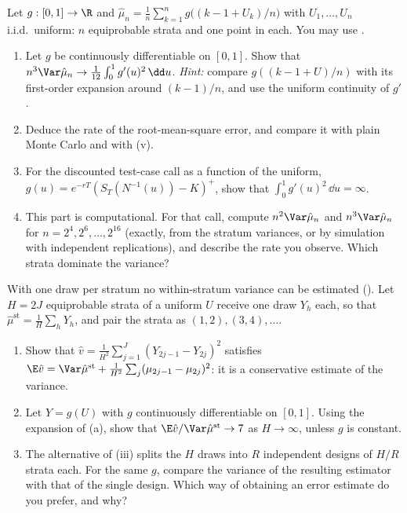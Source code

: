 \begin{exercise}\label{ex:st-one-point}
\medium Let $g:[0,1]\to\R$ and $\hat\mu_n=\frac1n\sum_{k=1}^ng\big((k-1+U_k)/n\big)$ with
$U_1,\dots,U_n$ i.i.d.\ uniform: $n$ equiprobable strata and one point in each. You may use
.
\begin{enumerate}[label=(\alph*)]
  \item Let $g$ be continuously differentiable on $[0,1]$. Show that
    $n^3\Var\hat\mu_n\to\frac1{12}\int_0^1g'(u)^2\,\dd u$. \emph{Hint:} compare
    $g((k-1+U)/n)$ with its first-order expansion around $(k-1)/n$, and use the uniform
    continuity of $g'$.
  \item Deduce the rate of the root-mean-square error, and compare it with plain Monte Carlo and
    with (v).
  \item For the discounted test-case call as a function of the uniform,
    $g(u)=e^{-rT}(S_T(N^{-1}(u))-K)^+$, show that $\int_0^1g'(u)^2\,\dd u=\infty$.
  \item This part is computational. For that call, compute $n^2\Var\hat\mu_n$ and
    $n^3\Var\hat\mu_n$ for $n=2^4,2^6,\dots,2^{16}$ (exactly, from the stratum variances, or
    by simulation with independent replications), and describe the rate you observe. Which
    strata dominate the variance?
\end{enumerate}
\end{exercise}

\begin{exercise}\label{ex:st-collapsed}
\medium With one draw per stratum no within-stratum variance can be estimated
(). Let $H=2J$ equiprobable strata of a uniform $U$ receive one draw
$Y_h$ each, so that $\hat\mu^{\mathrm{st}}=\frac1H\sum_hY_h$, and pair the strata as
$(1,2),(3,4),\dots$.
\begin{enumerate}[label=(\alph*)]
  \item Show that $\hat v=\frac1{H^2}\sum_{j=1}^J(Y_{2j-1}-Y_{2j})^2$ satisfies
    $\E\hat v=\Var\hat\mu^{\mathrm{st}}+\frac1{H^2}\sum_j(\mu_{2j-1}-\mu_{2j})^2$: it is a
    conservative estimate of the variance.
  \item Let $Y=g(U)$ with $g$ continuously differentiable on $[0,1]$. Using the expansion of
    (a), show that $\E\hat v/\Var\hat\mu^{\mathrm{st}}\to7$ as
    $H\to\infty$, unless $g$ is constant.
  \item The alternative of (iii) splits the $H$ draws into $R$
    independent designs of $H/R$ strata each. For the same $g$, compare the variance of the
    resulting estimator with that of the single design. Which way of obtaining an error
    estimate do you prefer, and why?
\end{enumerate}
\end{exercise}

